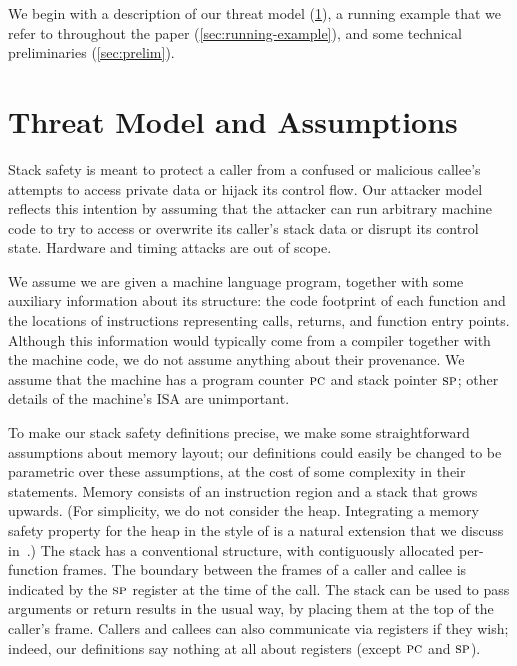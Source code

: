 \documentclass[acmsmall,review,anonymous]{acmart}\settopmatter{printfolios=true,printccs=false,printacmref=false}
\begin{document}
We begin with a description of our threat model
(\cref{sec:threat}), a running example that we refer to throughout the paper
(\cref{sec:running-example}),  and some technical preliminaries
(\cref{sec:prelim}).

\section{Threat Model and Assumptions}
\label{sec:threat}

Stack safety is meant to protect a caller from a confused or malicious callee's
attempts to access private data or hijack its control flow. Our
attacker model reflects this intention by assuming that the attacker
can run arbitrary machine code to try to access or overwrite its caller's stack data
or disrupt its control state.  Hardware and timing attacks are out of
scope.

\newcommand*{\rsp}{\textsc{sp}}

We assume we are given a machine language program, together with some auxiliary information
about its structure: the code footprint of each function and the locations of instructions
representing calls, returns, and function entry points.
Although this information would typically come from a compiler together with
the machine code, we do not
assume anything about their provenance.  We assume that the machine has a
program counter $\textsc{pc}$ 
and stack pointer $\rsp$; other details of the machine's ISA are unimportant.

To make our stack safety definitions precise, we make some straightforward
assumptions about 
memory layout; our definitions could easily be changed to be parametric over
these assumptions, at the cost of some complexity in their statements.  Memory
consists of an instruction region and a stack that grows upwards. (For simplicity,
we do not consider the heap. Integrating a memory safety property for the
heap in the style of 
\citet{DBLP:conf/post/AmorimHP18} is a natural extension that we discuss
in~.)  The stack has a conventional structure, with
contiguously allocated per-function frames.
The boundary between the frames of a caller and callee is indicated by the $\rsp$ register
at the time of the call.  The stack can be used to
pass arguments or return results in the usual way, by placing them
at the top of the caller's frame. Callers and callees can also communicate
via registers if they wish; indeed, our 
definitions say nothing at all about registers (except $\textsc{pc}$ and
$\rsp$). 
\end{document}

